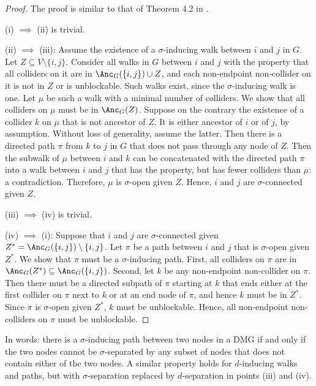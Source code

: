 \begin{proof}
  The proof is similar to that of Theorem 4.2 in \cite{RichardsonSpirtes02}.

  (i) $\implies$ (ii) is trivial.

  (ii) $\implies$ (iii): Assume the existence of a $\sigma$-inducing walk between $i$ and $j$ in $G$. 
  Let $Z \subseteq V\setminus\{i,j\}$. 
  Consider all walks in $G$ between $i$ and $j$ with the property that all colliders on it are in $\Anc_{G}({\{i,j\}) \cup Z}$, and each non-endpoint non-collider on it is not in $Z$ or is unblockable.
  Such walks exist, since the $\sigma$-inducing walk is one. 
  Let $\mu$ be such a walk with a minimal number of colliders.
  We show that all colliders on $\mu$ must be in $\Anc_{G}(Z)$. 
  Suppose on the contrary the existence of a collider $k$ on $\mu$ that is not ancestor of $Z$. 
  It is either ancestor of $i$ or of $j$, by assumption.
  Without loss of generality, assume the latter.
  Then there is a directed path $\pi$ from $k$ to $j$ in $G$ that does not pass through any node of $Z$. 
  Then the subwalk of $\mu$ between $i$ and $k$ can be concatenated with the directed path $\pi$
  into a walk between $i$ and $j$ that has the property, but has fewer colliders than $\mu$: a contradiction. 
  Therefore, $\mu$ is $\sigma$-open given $Z$.
  Hence, $i$ and $j$ are $\sigma$-connected given $Z$.

  (iii) $\implies$ (iv) is trivial.

  (iv) $\implies$ (i): Suppose that %
  $i$ and $j$ are $\sigma$-connected given $Z^* = \Anc_{G}(\{i,j\}) \setminus \{i,j\}$. 
  Let $\pi$ be a path between $i$ and $j$ that is $\sigma$-open given $Z^*$. %
  We show that $\pi$ must be a $\sigma$-inducing path. 
  First, all colliders on $\pi$ are in $\Anc_G(Z^*) \subseteq \Anc_{G}(\{i,j\})$. 
  Second, let $k$ be any non-endpoint non-collider on $\pi$.
  Then there must be a directed subpath of $\pi$ starting at $k$ that ends either at the first collider on $\pi$ next to $k$ or at an end node of $\pi$, and hence $k$ must be in $Z^*$. 
  Since $\pi$ is $\sigma$-open given $Z^*$, $k$ must be unblockable.
  Hence, all non-endpoint non-colliders on $\pi$ must be unblockable.
\end{proof}
In words: there is a $\sigma$-inducing path between two nodes in a DMG if and only if the two nodes cannot be $\sigma$-separated by any subset of nodes that does not contain either of the two nodes.
A similar property holds for $d$-inducing walks and paths, but with $\sigma$-separation replaced by $d$-separation in points (iii) and (iv).

